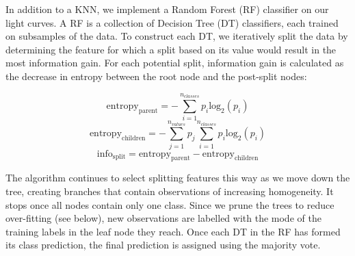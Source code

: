 \documentclass{article}
\begin{document}
In addition to a KNN, we implement a Random Forest (RF) classifier on our light curves. A RF is a collection of Decision Tree (DT) classifiers, each trained on subsamples of the data. To construct each DT, we iteratively split the data by determining the feature for which a split based on its value would result in the most information gain. For each potential split, information gain is calculated as the decrease in entropy between the root node and the post-split nodes:

\begin{equation}
    \mathrm{entropy_{parent}} = - \sum^{n_{classes}}_{i=1} p_i\mathrm{log}_2(p_i)
\end{equation}
\begin{equation}
    \mathrm{entropy_{children}} = - \sum^{n_{values}}_{j=1}p_j \sum^{n_{classes}}_{i=1} p_i\mathrm{log}_2(p_i)
\end{equation}
\begin{equation}
    \mathrm{info_{split}} = \mathrm{entropy_{parent}} -\mathrm{entropy_{children}}
\end{equation}

The algorithm continues to select splitting features this way as we move down the tree, creating branches that contain observations of increasing homogeneity. It stops once all nodes contain only one class. Since we prune the trees to reduce over-fitting (see below), new observations are labelled with the mode of the training labels in the leaf node they reach. Once each DT in the RF has formed its class prediction, the final prediction is assigned using the majority vote.
\end{document}
